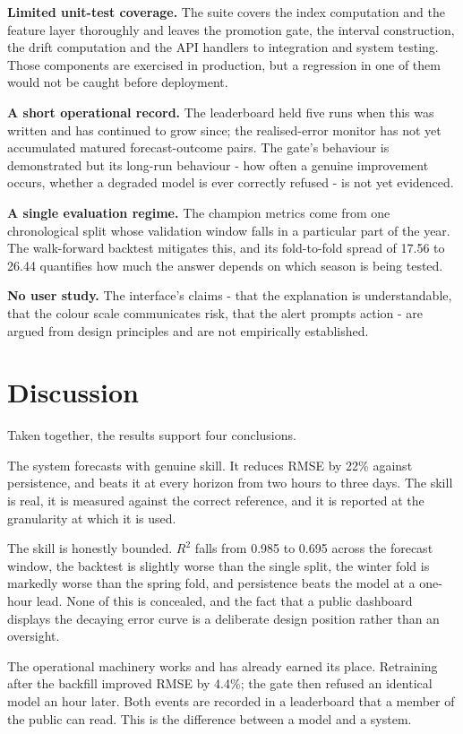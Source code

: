 \textbf{Limited unit-test coverage.} The suite covers the index computation and
the feature layer thoroughly and leaves the promotion gate, the interval
construction, the drift computation and the API handlers to integration and system
testing. Those components are exercised in production, but a regression in one of
them would not be caught before deployment.

\textbf{A short operational record.} The leaderboard held five runs when this was
written and has continued to grow since; the
realised-error monitor has not yet accumulated matured forecast-outcome pairs. The
gate's behaviour is demonstrated but its long-run behaviour - how often a genuine
improvement occurs, whether a degraded model is ever correctly refused - is not
yet evidenced.

\textbf{A single evaluation regime.} The champion metrics come from one
chronological split whose validation window falls in a particular part of the
year. The walk-forward backtest mitigates this, and its fold-to-fold spread of
17.56 to 26.44 quantifies how much the answer depends on which season is being
tested.

\textbf{No user study.} The interface's claims - that the explanation is
understandable, that the colour scale communicates risk, that the alert prompts
action - are argued from design principles and are not empirically established.

\section{Discussion}
Taken together, the results support four conclusions.

The system forecasts with genuine skill. It reduces RMSE by 22\% against
persistence, and beats it at every horizon from two hours to three days. The skill
is real, it is measured against the correct reference, and it is reported at the
granularity at which it is used.

The skill is honestly bounded. $R^2$ falls from 0.985 to 0.695 across the
forecast window, the backtest is slightly worse than the single split, the winter
fold is markedly worse than the spring fold, and persistence beats the model at a
one-hour lead. None of this is concealed, and the fact that a public dashboard
displays the decaying error curve is a deliberate design position rather than an
oversight.

The operational machinery works and has already earned its place. Retraining after
the backfill improved RMSE by 4.4\%; the gate then refused an identical model an
hour later. Both events are recorded in a leaderboard that a member of the public
can read. This is the difference between a model and a system.

